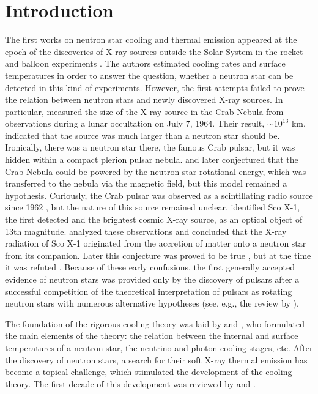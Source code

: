 \documentclass[smallextended]{svjour3}       %
\begin{document}
\section{Introduction} 
\label{intro}

The first works on neutron star cooling and thermal
emission 
\citep{Stabler60,Tsuruta64,ChiuSalpeter64,Morton64,BahcallWolf65a,BahcallWolf65b}
appeared at the epoch of the discoveries of X-ray sources
outside the Solar System in the rocket and balloon
experiments \citep{Giacconi-ea62,Bowyer-ea64a,Bowyer-ea64b}.
The authors estimated cooling rates and surface temperatures
in order to answer the question, whether a neutron star can
be detected in this kind of experiments. However, the first
attempts failed to prove the relation between neutron stars
and newly discovered X-ray sources. In particular,
\citet{Bowyer-ea64b} measured the size of the X-ray source
in the Crab Nebula from observations during a lunar
occultation on July 7, 1964. Their result, $\sim 10^{13}$
km, indicated that the source was much larger than a neutron
star should be. Ironically, there was a neutron star there,
the famous Crab pulsar, but it was hidden within a compact
plerion pulsar nebula. \citet{Kardashev64} and later
\citet{Pacini67} conjectured that the Crab Nebula could be
powered by the neutron-star rotational energy, which was
transferred to the nebula via the magnetic field, but this
model remained a hypothesis. Curiously, the Crab pulsar was
observed as a scintillating radio source since 1962
\citep{HewishOkoye65}, but the nature of this source
remained unclear. \citet{Sandage-ea66} identified Sco X-1,
the first detected and the brightest cosmic X-ray source, as
an optical object of 13th magnitude. \citet{Shklovsky67}
analyzed these observations and concluded that the X-ray
radiation of Sco X-1 originated from the accretion of matter
onto a neutron star from its companion. Later this
conjecture was proved to be true \citep{deFreitas77}, but at
the time it was refuted \citep{CameronScoX1}. Because of
these early confusions, the first generally accepted
evidence of neutron stars was provided only by the discovery
of pulsars \citep{Hewish-ea68} after a successful
competition of the theoretical interpretation of pulsars as
rotating neutron stars \citep{Gold68} with numerous
alternative hypotheses (see, e.g., the review by
\citealp{Ginzburg71}).

The foundation of the rigorous cooling theory was laid by
\citet{Tsuruta64} and \citet{TsurutaCameron66}, who
formulated the main elements of the theory: the relation
between the internal and surface temperatures of a neutron
star, the neutrino and photon cooling stages, etc. After the
discovery of neutron stars, a search for their soft X-ray
thermal emission has become a topical challenge, which
stimulated the development of the cooling theory. The first
decade of this development was reviewed by \citet{Tsuruta79}
and \citet{NomotoTsuruta81a}. 
\end{document}
